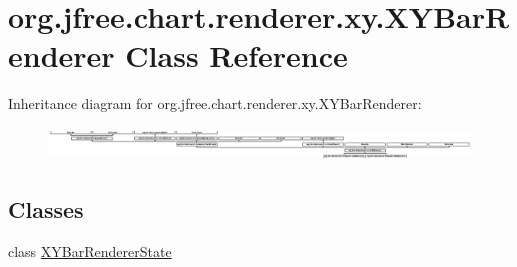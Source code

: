 \hypertarget{classorg_1_1jfree_1_1chart_1_1renderer_1_1xy_1_1_x_y_bar_renderer}{}\section{org.\+jfree.\+chart.\+renderer.\+xy.\+X\+Y\+Bar\+Renderer Class Reference}
\label{classorg_1_1jfree_1_1chart_1_1renderer_1_1xy_1_1_x_y_bar_renderer}
Inheritance diagram for org.\+jfree.\+chart.\+renderer.\+xy.\+X\+Y\+Bar\+Renderer\+:\begin{figure}[H]
\begin{center}
\leavevmode
\includegraphics[height=0.869565cm]{classorg_1_1jfree_1_1chart_1_1renderer_1_1xy_1_1_x_y_bar_renderer}
\end{center}
\end{figure}
\subsection*{Classes}
\begin{DoxyCompactItemize}
\item 
class \mbox{\hyperlink{classorg_1_1jfree_1_1chart_1_1renderer_1_1xy_1_1_x_y_bar_renderer_1_1_x_y_bar_renderer_state}{X\+Y\+Bar\+Renderer\+State}}
\end{DoxyCompactItemize}
